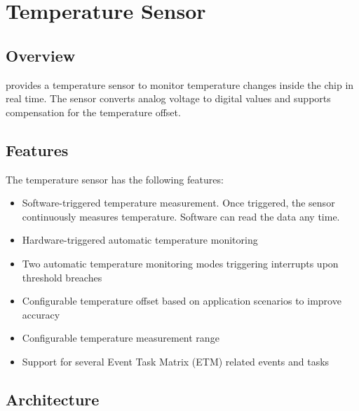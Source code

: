 \documentclass[main\_\_EN.tex]{subfiles}
\begin{document}
\setenglishformatting

\ifglobal
\else
    \clearpage
    \listoftodos
    \listofdonetodos
    \tableofcontents
\fi



\hypertarget{tmpsen}{}
\chapter{Temperature Sensor}
\label{mod:tmpsen}


\section{Overview}

\chipname{} provides a temperature sensor to monitor temperature changes inside the chip in real time. The sensor converts analog voltage to digital values and supports compensation for the temperature offset.

\section{Features}
The temperature sensor has the following features:
\begin{itemize}
    \item Software-triggered temperature measurement. Once triggered, the sensor continuously measures temperature. Software can read the data any time.
    \item Hardware-triggered automatic temperature monitoring
    \item Two automatic temperature monitoring modes triggering interrupts upon threshold breaches
    \item Configurable temperature offset based on application scenarios to improve accuracy
    \item Configurable temperature measurement range
    \item Support for several Event Task Matrix (ETM) related events and tasks
\end{itemize}

\section{Architecture}
\end{document}
